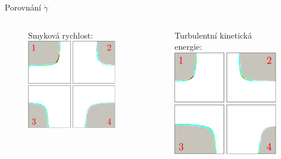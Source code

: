 \documentclass[aspectratio=169,xcolor=dvipsnames]{beamer}
\begin{document}
\begin{frame}{Porovnání $ \dot{\gamma} $}
	\addtocounter{framenumber}{-1}
	\begin{columns}
		\begin{column}{.42\textwidth}
			\begin{figure}
				\vspace{-1mm}
				Smyková rychlost:
				\includegraphics[width=0.8\linewidth, trim={0 0 0cm 0mm}, clip]{Images/gamma_frame.pdf}		
			\end{figure}
		\end{column}
		\begin{column}{.42\textwidth}
		\begin{figure}
			\vspace{-1mm}
			Turbulentní kinetická energie:
			\includegraphics[width=0.8\linewidth, trim={0 0 0 0mm}, clip]{Images/tke_frame.pdf}		

\end{figure}
\end{column}
\end{columns}
\end{frame}
\end{document}
